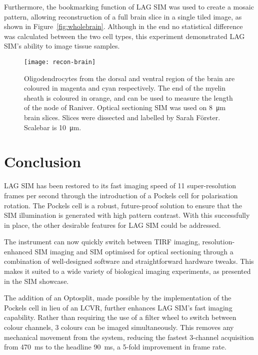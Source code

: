 Furthermore, the bookmarking function of LAG SIM was used to create a mosaic pattern, allowing reconstruction of a full brain slice in a single tiled image, as shown in Figure~\ref{fig:wholebrain}. 
Although in the end no statistical difference was calculated between the two cell types, this experiment demonstrated LAG SIM's ability to image tissue samples. 

\begin{figure}[tbp!]
\centering
\texttt{[image: recon-brain]}
\caption[LAG SIM: Multi-colour optical sectioning SIM to measure the node of Raniver]{Oligodendrocytes from the dorsal and ventral region of the brain are coloured in magenta and cyan respectively. The end of the myelin sheath is coloured in orange, and can be used to measure the length of the node of Raniver. Optical sectioning SIM was used on \SI{8}{\micro\metre} brain slices. Slices were dissected and labelled by Sarah F{\"o}rster. Scalebar is \SI{10}{\micro\metre}. }
\label{fig:recon-brain}
\end{figure}

\section{Conclusion}
LAG SIM has been restored to its fast imaging speed of 11 super-resolution frames per second through the introduction of a Pockels cell for polarisation rotation. 
The Pockels cell is a robust, future-proof solution to ensure that the SIM illumination is generated with high pattern contrast. 
With this successfully in place, the other desirable features for LAG SIM could be addressed. 

The instrument can now quickly switch between TIRF imaging, resolution-enhanced SIM imaging and SIM optimised for optical sectioning through a combination of well-designed software and straightforward hardware tweaks. 
This makes it suited to a wide variety of biological imaging experiments, as presented in the SIM showcase. 

The addition of an Optosplit, made possible by the implementation of the Pockels cell in lieu of an LCVR, further enhances LAG SIM's fast imaging capability. 
Rather than requiring the use of a filter wheel to switch between colour channels, 3 colours can be imaged simultaneously. 
This removes any mechanical movement from the system, reducing the fastest 3-channel acquisition from \SI{470}{\milli\second} to the headline \SI{90}{\milli\second}, a 5-fold improvement in frame rate. 


